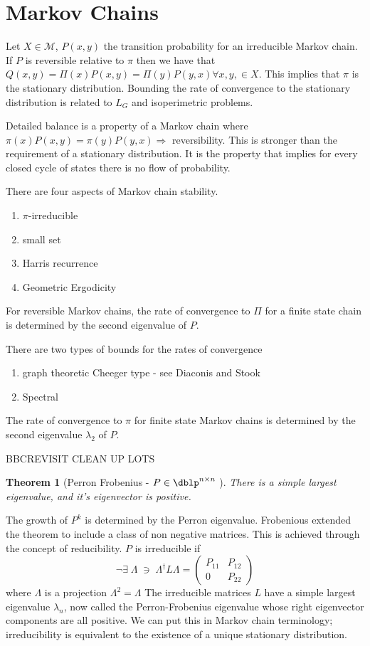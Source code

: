 \documentclass[a4paper]{article}
\theoremstyle{plain}
\newtheorem{thm}{Theorem}[section]
\theoremstyle{definition}
\theoremstyle{remark}
\newcommand{\st}{\; \ni \;}
\numberwithin{equation}{section}
\begin{document}
\section{Markov Chains}
Let $X \in \mathcal{M}$, $P(x,y)$ the transition probability for an irreducible Markov chain. If $P$ is reversible relative to $\pi$ then we have that $Q(x,y) = \Pi(x) P(x,y) =\Pi(y) P(y,x) \forall x,y, \in X$.  This implies that $\pi$ is the stationary distribution.  Bounding the rate of convergence to the stationary distribution is related to $L_G$ and isoperimetric problems.

Detailed balance is a property of a Markov chain where $\pi(x) P(x,y) =\pi(y) P(y,x) \Rightarrow$ reversibility.  This is stronger than the requirement of a stationary distribution.  It is the property that implies for every closed cycle of states there is no flow of probability.

There are four aspects of Markov chain stability.
\begin{enumerate}
\item $\pi$-irreducible
\item small set
\item Harris recurrence
\item Geometric Ergodicity
\end{enumerate}

For reversible Markov chains, the rate of convergence to $\Pi$ for a finite state chain is determined by the second eigenvalue of $P$.

There are two types of bounds for the rates of convergence
\begin{enumerate}
\item graph theoretic Cheeger type - see Diaconis and Stook
\item Spectral
\end{enumerate}
The rate of convergence to $\pi$ for finite state Markov chains is determined by the second eigenvalue $\lambda_2$ of $P$.

BBCREVISIT CLEAN UP LOTS
\begin{thm}[Perron Frobenius - $P \in \dblp^{n \times n}$ ]
There is a simple largest eigenvalue, and it's eigenvector is positive.

\end{thm}
The growth of $P^k$ is determined by the Perron eigenvalue.  Frobenious extended the theorem to include a class of non negative matrices.  This is achieved through the concept of reducibility.  $P$ is irreducible if
\begin{equation*}
\neg \exists \; \Lambda \st\Lambda^\dag L \Lambda =
 \left( \begin{array}{cc}
P_{11} & P_{12}  \\
0 & P_{22} \end{array} \right)
\end{equation*}
where $\Lambda$ is a projection $\Lambda^2 = \Lambda$
The irreducible matrices $L$ have a simple largest eigenvalue $\lambda_n$, now called the Perron-Frobenius eigenvalue whose right eigenvector components are all positive.  We can put this in Markov chain terminology; irreducibility is equivalent to the existence of a unique stationary distribution.
\end{document}
